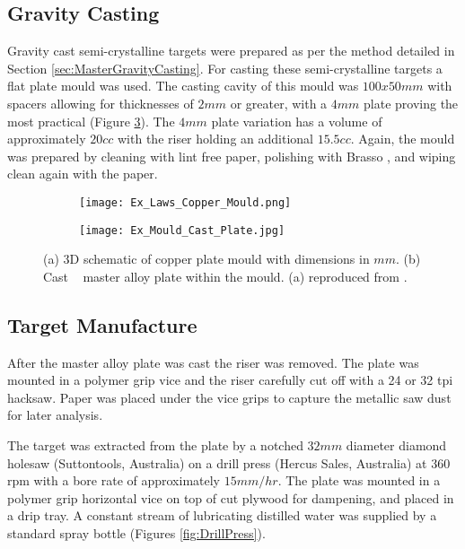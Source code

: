 \subsection{Gravity Casting}
Gravity cast semi-crystalline targets were prepared as per the method detailed in Section \ref{sec:MasterGravityCasting}. For casting these semi-crystalline targets a flat plate mould was used. The casting cavity of this mould was $100 x 50 mm$ with spacers allowing for thicknesses of $2 mm$ or greater, with a $4 mm$ plate proving the most practical (Figure \ref{fig:PlateMould}). The $4 mm$ plate variation has a volume of approximately $20 cc$ with the riser holding an additional $15.5 cc$. Again, the mould was prepared by cleaning with lint free paper, polishing with Brasso \textcopyright, and wiping clean again with the paper.

\begin{figure}[htbp]
	\begin{subfigure}[htbp]{0.41\textwidth}
		\texttt{[image: Ex\_Laws\_Copper\_Mould.png]}
		\caption{}
		\label{fig:LawsMould}
	\end{subfigure}
	\begin{subfigure}[htbp]{0.49\textwidth}
		\texttt{[image: Ex\_Mould\_Cast\_Plate.jpg]}
		\caption{}
		\label{fig:FilledMould}
	\end{subfigure}
	\caption[(a) 3D schematic of copper plate mould with dimensions in $mm$. (b) Cast \MgZnCa~ master alloy plate within the mould.]{(a) 3D schematic of copper plate mould with dimensions in $mm$. (b) Cast \MgZnCa~ master alloy plate within the mould. (a) reproduced from \cite{Laws2007}.}%
	\label{fig:PlateMould}
\end{figure}

\subsection{Target Manufacture} \label{sec:TargetManufacture}
After the master alloy plate was cast the riser was removed. The plate was mounted in a polymer grip vice and the riser carefully cut off with a 24 or 32 \acrshort{tpi} hacksaw. Paper was placed under the vice grips to capture the metallic saw dust for later analysis.

The target was extracted from the plate by a notched $32 mm$ diameter diamond holesaw (Suttontools, Australia) on a drill press (Hercus Sales, Australia) at 360 \acrshort{rpm} with a bore rate of approximately $15 mm/hr$. The plate was mounted in a polymer grip horizontal vice on top of cut plywood for dampening, and placed in a drip tray. A constant stream of lubricating distilled water was supplied by a standard spray bottle (Figures \ref{fig:DrillPress}).

